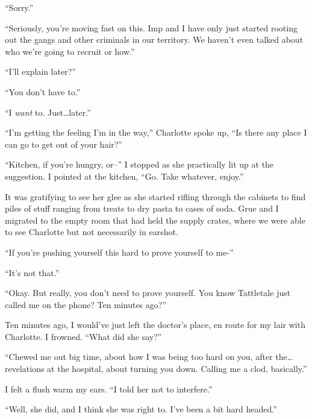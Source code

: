 ``Sorry.''



``Seriously, you're moving fast on this.  Imp and I have only just started rooting out the gangs and other criminals in our territory.  We haven't even talked about who we're going to recruit or how.''



``I'll explain later?''



``You don't have to.''



``I \emph{want} to.  Just\ldots later.''



``I'm getting the feeling I'm in the way,'' Charlotte spoke up, ``Is there any place I can go to get out of your hair?''



``Kitchen, if you're hungry, or--''  I stopped as she practically lit up at the suggestion.  I pointed at the kitchen, ``Go.  Take whatever, enjoy.''



It was gratifying to see her glee as she started rifling through the cabinets to find piles of stuff ranging from treats to dry pasta to cases of soda.  Grue and I migrated to the empty room that had held the supply crates, where we were able to see Charlotte but not necessarily in earshot.



``If you're pushing yourself this hard to prove yourself to me-''



``It's not that.''



``Okay.  But really, you don't need to prove yourself.  You know Tattletale just called me on the phone?  Ten minutes ago?''



Ten minutes ago, I would've just left the doctor's place, en route for my lair with Charlotte.  I frowned.  ``What did she say?''



``Chewed me out big time, about how I was being too hard on you, after the\ldots revelations at the hospital, about turning you down.  Calling me a clod, basically.''



I felt a flush warm my ears.  ``I told her not to interfere.''



``Well, she did, and I think she was right to.  I've been a bit hard headed.''



